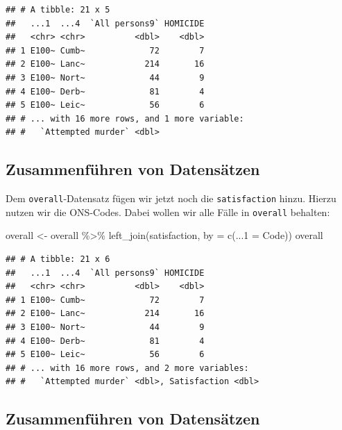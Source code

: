 \documentclass[
]{book}
\newenvironment{Shaded}{\begin{snugshade}}{\end{snugshade}}
\newcommand{\AttributeTok}[1]{\textcolor[rgb]{0.77,0.63,0.00}{#1}}
\newcommand{\FunctionTok}[1]{\textcolor[rgb]{0.00,0.00,0.00}{#1}}
\newcommand{\NormalTok}[1]{#1}
\newcommand{\OtherTok}[1]{\textcolor[rgb]{0.56,0.35,0.01}{#1}}
\newcommand{\SpecialCharTok}[1]{\textcolor[rgb]{0.00,0.00,0.00}{#1}}
\newcommand{\StringTok}[1]{\textcolor[rgb]{0.31,0.60,0.02}{#1}}
\begin{document}
\begin{verbatim}
## # A tibble: 21 x 5
##   ...1  ...4  `All persons9` HOMICIDE
##   <chr> <chr>          <dbl>    <dbl>
## 1 E100~ Cumb~             72        7
## 2 E100~ Lanc~            214       16
## 3 E100~ Nort~             44        9
## 4 E100~ Derb~             81        4
## 5 E100~ Leic~             56        6
## # ... with 16 more rows, and 1 more variable:
## #   `Attempted murder` <dbl>
\end{verbatim}

\hypertarget{zusammenfuxfchren-von-datensuxe4tzen-2}{%
\subsection{Zusammenführen von Datensätzen}\label{zusammenfuxfchren-von-datensuxe4tzen-2}}

Dem \texttt{overall}-Datensatz fügen wir jetzt noch die \texttt{satisfaction} hinzu. Hierzu nutzen wir die ONS-Codes. Dabei wollen wir alle Fälle in \texttt{overall} behalten:

\begin{Shaded}
\begin{Highlighting}[]
\NormalTok{overall }\OtherTok{\textless{}{-}}\NormalTok{ overall }\SpecialCharTok{\%\textgreater{}\%} 
  \FunctionTok{left\_join}\NormalTok{(satisfaction, }\AttributeTok{by =} \FunctionTok{c}\NormalTok{(}\StringTok{\textquotesingle{}...1\textquotesingle{}} \OtherTok{=} \StringTok{\textquotesingle{}Code\textquotesingle{}}\NormalTok{))}
\NormalTok{overall}
\end{Highlighting}
\end{Shaded}

\begin{verbatim}
## # A tibble: 21 x 6
##   ...1  ...4  `All persons9` HOMICIDE
##   <chr> <chr>          <dbl>    <dbl>
## 1 E100~ Cumb~             72        7
## 2 E100~ Lanc~            214       16
## 3 E100~ Nort~             44        9
## 4 E100~ Derb~             81        4
## 5 E100~ Leic~             56        6
## # ... with 16 more rows, and 2 more variables:
## #   `Attempted murder` <dbl>, Satisfaction <dbl>
\end{verbatim}

\hypertarget{zusammenfuxfchren-von-datensuxe4tzen-3}{%
\subsection{Zusammenführen von Datensätzen}\label{zusammenfuxfchren-von-datensuxe4tzen-3}}
\end{document}
